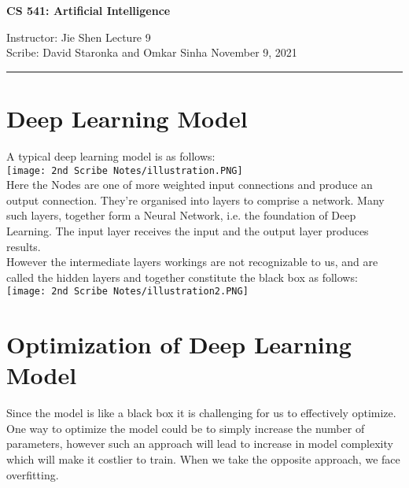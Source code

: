 \documentclass[12pt]{article}
\begin{document}


\begin{center}
\bf\large CS 541: Artificial Intelligence
\end{center}

\noindent
Instructor: Jie Shen
\hfill
Lecture 9               %
\\
Scribe:   David Staronka and Omkar Sinha              %
\hfill
November 9, 2021                         %

\noindent
\rule{\textwidth}{1pt}

\medskip


    \section{Deep Learning Model}
    A typical deep learning model is as follows:\\
    \texttt{[image: 2nd Scribe Notes/illustration.PNG]}
    \\
    
    Here the Nodes are one of more weighted input connections and produce an output connection. They're organised into layers to comprise a network. Many such layers, together form a Neural Network, i.e. the foundation of Deep Learning.
    The input layer receives the input and the output layer produces results. 
    \\
    
    However the intermediate layers workings are not recognizable to us, and are called the hidden layers and together constitute the black box as follows:
    \\
    \texttt{[image: 2nd Scribe Notes/illustration2.PNG]}
    \\
    \section{Optimization of Deep Learning Model}
    
    Since the model is like a black box it is challenging for us to effectively optimize. One way to optimize the model could be to simply increase the number of parameters, however such an approach will lead to increase in model complexity which will make it costlier to train. When we take the opposite approach, we face overfitting.\\
    
\end{document}
